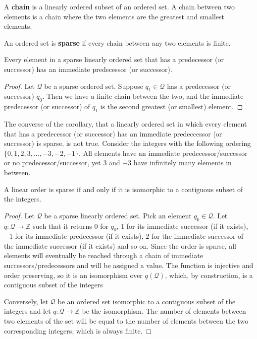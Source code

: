 \documentclass[11pt,letterpaper,fleqn]{memoir} %
\begin{document}
\begin{mathSection}
\begin{defn}
	A \textbf{chain} is a linearly ordered subset of an ordered set. A chain between two elements is a chain where the two elements are the greatest and smallest elements.
\end{defn}
\begin{defn}
	An ordered set is \textbf{sparse} if every chain between any two elements is finite.
\end{defn}
\begin{coro}
	Every element in a sparse linearly ordered set that has a predecessor (or successor) has an immediate predecessor (or successor).
\end{coro}
\begin{proof}
	Let $\mathcal{Q}$ be a sparse ordered set. Suppose $q_1 \in \mathcal{Q}$ has a predecessor (or successor) $q_0$. Then we have a finite chain between the two, and the immediate predecessor (or successor) of $q_1$ is the second greatest (or smallest) element.
\end{proof}

\begin{remark}
	The converse of the corollary, that a linearly ordered set in which every element that has a predecessor (or successor) has an immediate predeccessor (or successor) is sparse, is not true. Consider the integers with the following ordering $\{0, 1, 2, 3, ... , -3, -2, -1\}$. All elements have an immediate predecessor/successor or no predecessor/successor, yet $3$ and $-3$ have infinitely many elements in between.
\end{remark}
\begin{prop}
	A linear order is sparse if and only if it is isomorphic to a contiguous subset of the integers.
\end{prop}
\begin{proof}
	Let $\mathcal{Q}$ be a sparse linearly ordered set. Pick an element $q_0 \in \mathcal{Q}$. Let $q : \mathcal{Q} \to \mathbb{Z}$ such that it returns $0$ for $q_0$, $1$ for its immediate successor (if it exists), $-1$ for its immediate predecessor (if it exists), $2$ for the immediate successor of the immediate successor (if it exists) and so on. Since the order is sparse, all elements will eventually be reached through a chain of immediate successors/predecessors and will be assigned a value. The function is injective and order preserving, so it is an isomorphism over $q(\mathcal{Q})$, which, by construction, is a contiguous subset of the integers
	
	Conversely, let $\mathcal{Q}$ be an ordered set isomorphic to a contiguous subset of the integers and let $q : \mathcal{Q} \to \mathbb{Z}$ be the isomorphism. The number of elements between two elements of the set will be equal to the number of elements between the two corresponding integers, which is always finite.
\end{proof}

\end{mathSection}
\end{document}
